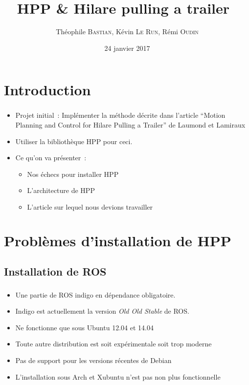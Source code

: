 \documentclass[11pt]{beamer}
\author{Théophile \textsc{Bastian}, Kévin \textsc{Le Run}, Rémi \textsc{Oudin}}
\title{HPP \& \og{}Hilare pulling a trailer~\fg}
\date{24 janvier 2017}
\begin{document}
\begin{frame}
	\titlepage{}
\end{frame}

\begin{frame}
    \tableofcontents
\end{frame}



\section*{Introduction}

\begin{frame}
    \frametitle{\secname}
    \begin{itemize}
        \item Projet initial~: Implémenter la méthode décrite dans l'article
            ``Motion Planning and Control for Hilare Pulling a Trailer''
            de Laumond et Lamiraux
        \item Utiliser la bibliothèque HPP pour ceci.
        \item Ce qu'on va présenter~:
            \begin{itemize}
                \item Nos échecs pour installer HPP
                \item L'architecture de HPP
                \item L'article sur lequel nous devions travailler
            \end{itemize}
    \end{itemize}
\end{frame}

\section{Problèmes d'installation de HPP}

\subsection{Installation de ROS}

\begin{frame}
    \frametitle{\subsecname}
    \begin{itemize}
        \item Une partie de ROS indigo en dépendance obligatoire.
        \item Indigo est actuellement la version \emph{Old Old Stable} de ROS\@.
        \item Ne fonctionne que sous Ubuntu 12.04 et 14.04
        \item Toute autre distribution est soit expérimentale soit trop moderne
        \item Pas de support pour les versions récentes de Debian
        \item L'installation sous Arch et Xubuntu n'est pas non plus
            fonctionnelle
    \end{itemize}
\end{frame}
\end{document}

